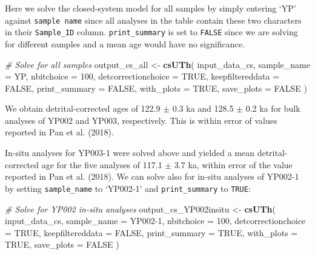 \documentclass[]{elsarticle} %
\newenvironment{Shaded}{\begin{snugshade}}{\end{snugshade}}
\newcommand{\CommentTok}[1]{\textcolor[rgb]{0.56,0.35,0.01}{\textit{#1}}}
\newcommand{\DataTypeTok}[1]{\textcolor[rgb]{0.13,0.29,0.53}{#1}}
\newcommand{\DecValTok}[1]{\textcolor[rgb]{0.00,0.00,0.81}{#1}}
\newcommand{\KeywordTok}[1]{\textcolor[rgb]{0.13,0.29,0.53}{\textbf{#1}}}
\newcommand{\NormalTok}[1]{#1}
\newcommand{\OtherTok}[1]{\textcolor[rgb]{0.56,0.35,0.01}{#1}}
\newcommand{\StringTok}[1]{\textcolor[rgb]{0.31,0.60,0.02}{#1}}
\begin{document}
Here we solve the closed-system model for all samples by simply entering `YP' against \texttt{sample\ name} since all analyses in the table contain these two characters in their \texttt{Sample\_ID} column. \texttt{print\_summary} is set to \texttt{FALSE} since we are solving for different samples and a mean age would have no significance.

\begin{Shaded}
\begin{Highlighting}[]
\CommentTok{\# Solve for all samples}
\NormalTok{output\_cs\_all \textless{}{-}}
\StringTok{  }\KeywordTok{csUTh}\NormalTok{(}
\NormalTok{    input\_data\_cs,}
    \DataTypeTok{sample\_name =} \StringTok{\textquotesingle{}YP\textquotesingle{}}\NormalTok{,}
    \DataTypeTok{nbitchoice =} \DecValTok{100}\NormalTok{,}
    \DataTypeTok{detcorrectionchoice =} \OtherTok{TRUE}\NormalTok{,}
    \DataTypeTok{keepfiltereddata =} \OtherTok{FALSE}\NormalTok{,}
    \DataTypeTok{print\_summary =} \OtherTok{FALSE}\NormalTok{,}
    \DataTypeTok{with\_plots =} \OtherTok{TRUE}\NormalTok{,}
    \DataTypeTok{save\_plots =} \OtherTok{FALSE}
\NormalTok{  )}
\end{Highlighting}
\end{Shaded}

We obtain detrital-corrected ages of 122.9 \(\pm\) 0.3 ka and 128.5 \(\pm\) 0.2 ka for bulk analyses of YP002 and YP003, respectively. This is within error of values reported in Pan et al. (2018).

In-situ analyses for YP003-1 were solved above and yielded a mean detrital-corrected age for the five analyses of 117.1 \(\pm\) 3.7 ka, within error of the value reported in Pan et al. (2018).
We can solve also for in-situ analyses of YP002-1 by setting \texttt{sample\_name} to `YP002-1' and \texttt{print\_summary} to \texttt{TRUE}:

\begin{Shaded}
\begin{Highlighting}[]
\CommentTok{\# Solve for YP002 in{-}situ analyses}
\NormalTok{output\_cs\_YP002insitu \textless{}{-}}
\StringTok{  }\KeywordTok{csUTh}\NormalTok{(}
\NormalTok{    input\_data\_cs,}
    \DataTypeTok{sample\_name =} \StringTok{\textquotesingle{}YP002{-}1\textquotesingle{}}\NormalTok{,}
    \DataTypeTok{nbitchoice =} \DecValTok{100}\NormalTok{,}
    \DataTypeTok{detcorrectionchoice =} \OtherTok{TRUE}\NormalTok{,}
    \DataTypeTok{keepfiltereddata =} \OtherTok{FALSE}\NormalTok{,}
    \DataTypeTok{print\_summary =} \OtherTok{TRUE}\NormalTok{,}
    \DataTypeTok{with\_plots =} \OtherTok{TRUE}\NormalTok{,}
    \DataTypeTok{save\_plots =} \OtherTok{FALSE}
\NormalTok{  )}
\end{Highlighting}
\end{Shaded}
\end{document}
